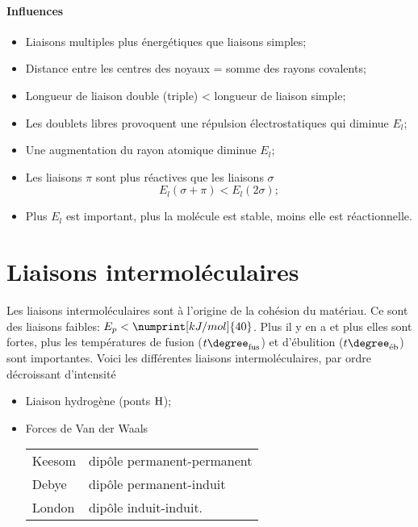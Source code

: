 \paragraph{Influences}
\begin{itemize}
	\item Liaisons multiples plus énergétiques que liaisons simples;
	\item Distance entre les centres des noyaux = somme des rayons covalents;
	\item Longueur de liaison double (triple) < longueur de liaison simple;
	\item Les doublets libres provoquent une répulsion électrostatiques qui diminue $E_l$;
	\item Une augmentation du rayon atomique diminue $E_l$;
	\item Les liaisons $\pi$ sont plus réactives que les liaisons $\sigma$
		\[ E_l(\sigma + \pi) <  E_l(2\sigma) ; \]
	\item Plus $E_l$ est important, plus la molécule est stable, moins elle est réactionnelle.
\end{itemize}

\section{Liaisons intermoléculaires}
Les liaisons intermoléculaires sont à l'origine de la cohésion du matériau.
Ce sont des liaisons faibles: $E_p<\numprint[kJ/mol]{40}$.
Plus il y en a et plus elles sont fortes, plus les températures de fusion ($t\degree_{\mathrm{fus}}$) et d'ébulition ($t\degree_{\textrm{éb}}$) sont importantes.
Voici les différentes liaisons intermoléculaires, par ordre décroissant d'intensité
\begin{itemize}
	\item Liaison hydrogène (ponts $\ce{H}$);
	\item Forces de Van der Waals
		\begin{center}
			\begin{tabular}{ll}
				Keesom & dipôle permanent-permanent\\
				Debye & dipôle permanent-induit\\
				London & dipôle induit-induit.
			\end{tabular}
		\end{center}
\end{itemize}

